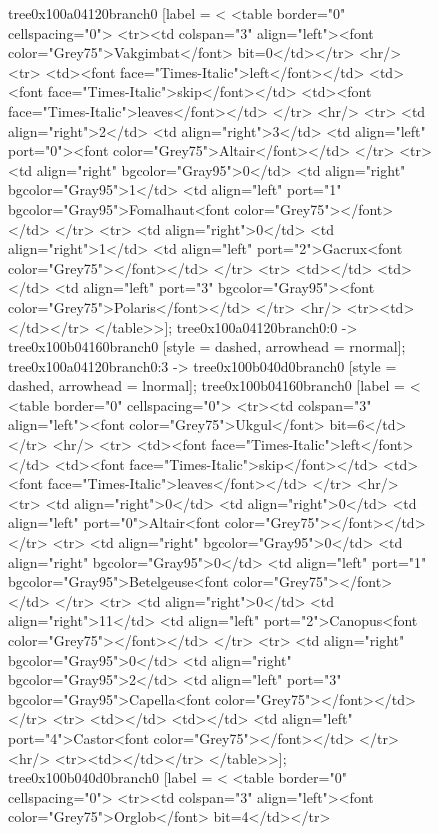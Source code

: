 \documentclass[12pt]{article}
\begin{document}
\begin{figure}
{{	tree0x100a04120branch0 [label = <
<table border="0" cellspacing="0">
	<tr><td colspan="3" align="left"><font color="Grey75">Vakgimbat</font> bit=0</td></tr>
	<hr/>
	<tr>
		<td><font face="Times-Italic">left</font></td>
		<td><font face="Times-Italic">skip</font></td>
		<td><font face="Times-Italic">leaves</font></td>
	</tr>
	<hr/>
	<tr>
		<td align="right">2</td>
		<td align="right">3</td>
		<td align="left" port="0"><font color="Grey75">Altair</font></td>
	</tr>
	<tr>
		<td align="right" bgcolor="Gray95">0</td>
		<td align="right" bgcolor="Gray95">1</td>
		<td align="left" port="1" bgcolor="Gray95">Fomalhaut<font color="Grey75"></font></td>
	</tr>
	<tr>
		<td align="right">0</td>
		<td align="right">1</td>
		<td align="left" port="2">Gacrux<font color="Grey75"></font></td>
	</tr>
	<tr>
		<td></td>
		<td></td>
		<td align="left" port="3" bgcolor="Gray95"><font color="Grey75">Polaris</font></td>
	</tr>
	<hr/>
	<tr><td></td></tr>
</table>>];
	tree0x100a04120branch0:0 -> tree0x100b04160branch0 [style = dashed, arrowhead = rnormal];
	tree0x100a04120branch0:3 -> tree0x100b040d0branch0 [style = dashed, arrowhead = lnormal];
	tree0x100b04160branch0 [label = <
<table border="0" cellspacing="0">
	<tr><td colspan="3" align="left"><font color="Grey75">Ukgul</font> bit=6</td></tr>
	<hr/>
	<tr>
		<td><font face="Times-Italic">left</font></td>
		<td><font face="Times-Italic">skip</font></td>
		<td><font face="Times-Italic">leaves</font></td>
	</tr>
	<hr/>
	<tr>
		<td align="right">0</td>
		<td align="right">0</td>
		<td align="left" port="0">Altair<font color="Grey75"></font></td>
	</tr>
	<tr>
		<td align="right" bgcolor="Gray95">0</td>
		<td align="right" bgcolor="Gray95">0</td>
		<td align="left" port="1" bgcolor="Gray95">Betelgeuse<font color="Grey75"></font></td>
	</tr>
	<tr>
		<td align="right">0</td>
		<td align="right">11</td>
		<td align="left" port="2">Canopus<font color="Grey75"></font></td>
	</tr>
	<tr>
		<td align="right" bgcolor="Gray95">0</td>
		<td align="right" bgcolor="Gray95">2</td>
		<td align="left" port="3" bgcolor="Gray95">Capella<font color="Grey75"></font></td>
	</tr>
	<tr>
		<td></td>
		<td></td>
		<td align="left" port="4">Castor<font color="Grey75"></font></td>
	</tr>
	<hr/>
	<tr><td></td></tr>
</table>>];
	tree0x100b040d0branch0 [label = <
<table border="0" cellspacing="0">
	<tr><td colspan="3" align="left"><font color="Grey75">Orglob</font> bit=4</td></tr>
}}
\end{figure}
\end{document}
